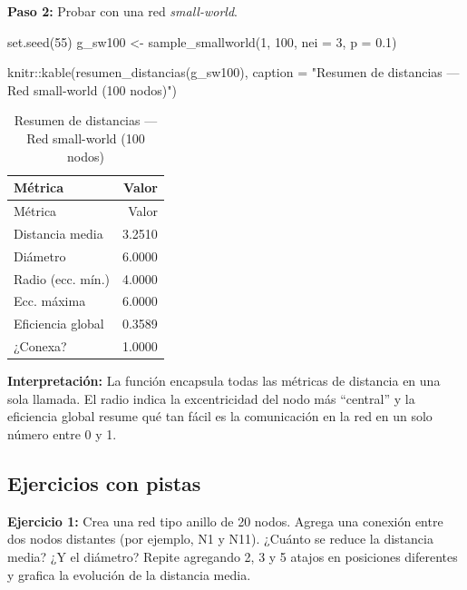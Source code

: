 \documentclass[
  letterpaper,
  DIV=11,
  numbers=noendperiod]{scrreprt}
\newenvironment{Shaded}{\begin{snugshade}}{\end{snugshade}}
\newcommand{\AttributeTok}[1]{\textcolor[rgb]{0.40,0.45,0.13}{#1}}
\newcommand{\DecValTok}[1]{\textcolor[rgb]{0.68,0.00,0.00}{#1}}
\newcommand{\FloatTok}[1]{\textcolor[rgb]{0.68,0.00,0.00}{#1}}
\newcommand{\FunctionTok}[1]{\textcolor[rgb]{0.28,0.35,0.67}{#1}}
\newcommand{\NormalTok}[1]{\textcolor[rgb]{0.00,0.23,0.31}{#1}}
\newcommand{\OtherTok}[1]{\textcolor[rgb]{0.00,0.23,0.31}{#1}}
\newcommand{\SpecialCharTok}[1]{\textcolor[rgb]{0.37,0.37,0.37}{#1}}
\newcommand{\StringTok}[1]{\textcolor[rgb]{0.13,0.47,0.30}{#1}}
\begin{document}
\begin{tcolorbox}
\textbf{Paso 2:} Probar con una red \emph{small-world}.

\begin{Shaded}
\begin{Highlighting}[]
\FunctionTok{set.seed}\NormalTok{(}\DecValTok{55}\NormalTok{)}
\NormalTok{g\_sw100 }\OtherTok{\textless{}{-}} \FunctionTok{sample\_smallworld}\NormalTok{(}\DecValTok{1}\NormalTok{, }\DecValTok{100}\NormalTok{, }\AttributeTok{nei =} \DecValTok{3}\NormalTok{, }\AttributeTok{p =} \FloatTok{0.1}\NormalTok{)}

\NormalTok{knitr}\SpecialCharTok{::}\FunctionTok{kable}\NormalTok{(}\FunctionTok{resumen\_distancias}\NormalTok{(g\_sw100),}
             \AttributeTok{caption =} \StringTok{"Resumen de distancias — Red small{-}world (100 nodos)"}\NormalTok{)}
\end{Highlighting}
\end{Shaded}

\begin{longtable}[]{@{}lr@{}}
\caption{Resumen de distancias --- Red small-world (100
nodos)}\tabularnewline
\toprule\noalign{}
Métrica & Valor \\
\midrule\noalign{}
\endfirsthead
\toprule\noalign{}
Métrica & Valor \\
\midrule\noalign{}
\endhead
\bottomrule\noalign{}
\endlastfoot
Distancia media & 3.2510 \\
Diámetro & 6.0000 \\
Radio (ecc. mín.) & 4.0000 \\
Ecc. máxima & 6.0000 \\
Eficiencia global & 0.3589 \\
¿Conexa? & 1.0000 \\
\end{longtable}

\textbf{Interpretación:} La función encapsula todas las métricas de
distancia en una sola llamada. El radio indica la excentricidad del nodo
más ``central'' y la eficiencia global resume qué tan fácil es la
comunicación en la red en un solo número entre 0 y 1.

\end{tcolorbox}

\subsection*{Ejercicios con pistas}\label{ejercicios-con-pistas-2}

\textbf{Ejercicio 1:} Crea una red tipo anillo de 20 nodos. Agrega una
conexión entre dos nodos distantes (por ejemplo, N1 y N11). ¿Cuánto se
reduce la distancia media? ¿Y el diámetro? Repite agregando 2, 3 y 5
atajos en posiciones diferentes y grafica la evolución de la distancia
media.
\end{document}

